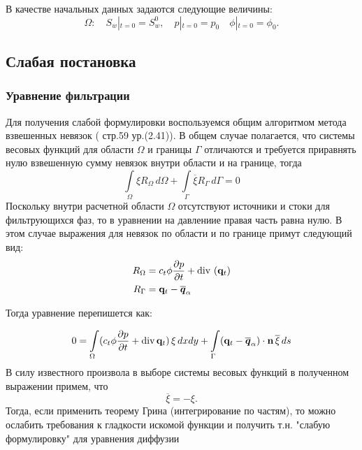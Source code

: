 В качестве начальных данных задаются следующие величины:
\begin{equation}\label{eq:init_cond}
	\Omega: \quad S_w\left|_{t=0} = S_w^0\right., \quad p\left|_{t=0} = p_0\right.  \quad \phi\left|_{t=0} = \phi_0\right..
\end{equation}



\subsection{Слабая постановка}


\subsubsection{Уравнение фильтрации}
Для получения слабой формулировки воспользуемся общим алгоритмом метода взвешенных невязок 
(\cite{Zenkevich_1986} стр.59 ур.(2.41)). В общем случае полагается, что системы весовых
функций для области $\Omega$ и границы $\Gamma$ отличаются и требуется приравнять нулю 
взвешенную сумму невязок внутри области и на границе, тогда
 \begin{equation}\label{eq:residuals}
	\int\limits_\Omega \xi R_\Omega \,d\Omega + \int\limits_\Gamma \overline{\xi}R_\Gamma \,d\Gamma = 0
 \end{equation} 
Поскольку внутри расчетной области $\Omega$ отсутствуют источники и стоки для фильтрующихся фаз,
то в уравнении на давлениие  правая часть равна нулю. В этом случае выражения для невязок 
по области и по границе примут следующий вид:
\begin{equation}
	\begin{aligned}
		R_\Omega &= c_t\phi \dfrac{\partial p}{\partial t} + \operatorname{div}\, \left( \mathbf{q}_t \right)\\
		R_\Gamma &= \mathbf{q}_t - \overline{\bm{q}}_{\alpha}
	\end{aligned}
\end{equation}

Тогда уравнение  перепишется как:

\begin{equation}
	\displaystyle 0=\int\limits_\Omega  (c_t\phi \dfrac{\partial p}{\partial t} + \operatorname{div}{\mathbf{q}_t}) \,\xi \,dx dy
	+ \int\limits_{\Gamma} (\mathbf{q}_t - \overline{\bm{q}}_{\alpha})\cdot \mathbf{n} \, \overline{\xi} \,ds
\end{equation}
В силу известного произвола в выборе системы весовых функций в полученном выражении примем, что
\begin{equation}
	\overline{\xi} = -\xi.
\end{equation}
Тогда, если применить теорему Грина (интегрирование по частям), то можно ослабить требования к гладкости
искомой функции и получить т.н. "слабую формулировку" для уравнения  диффузии 

